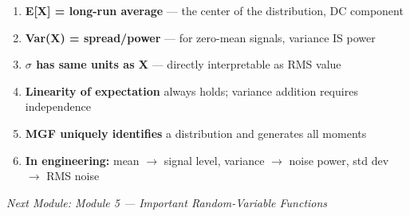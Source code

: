 
\begin{enumerate}
\def\labelenumi{\arabic{enumi}.}
\tightlist
\item
  \textbf{E[X] = long-run average} — the center of the distribution, DC component
\item
  \textbf{Var(X) = spread/power} — for zero-mean signals, variance IS power
\item
  \textbf{\ensuremath{\sigma} has same units as X} — directly interpretable as RMS value
\item
  \textbf{Linearity of expectation} always holds; variance addition requires independence
\item
  \textbf{MGF uniquely identifies} a distribution and generates all moments
\item
  \textbf{In engineering:} mean \ensuremath{\to} signal level, variance \ensuremath{\to} noise power, std dev \ensuremath{\to} RMS noise
\end{enumerate}

\emph{Next Module: {Module 5 — Important Random-Variable Functions}}
